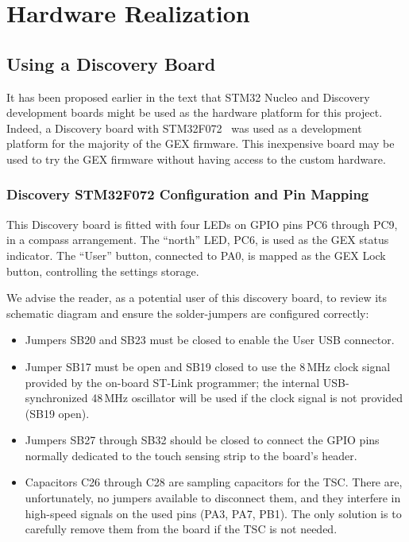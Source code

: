 \chapter{Hardware Realization} \label{sec:hwreal}

\section{Using a Discovery Board}

It has been proposed earlier in the text that STM32 Nucleo and Discovery development boards might be used as the hardware platform for this project. Indeed, a Discovery board with STM32F072~\cite{disco-f072} was used as a development platform for the majority of the GEX firmware. This inexpensive board may be used to try the GEX firmware without having access to the custom hardware.

\subsection{Discovery STM32F072 Configuration and Pin Mapping}

This Discovery board is fitted with four \glspl{LED} on \gls{GPIO} pins PC6 through PC9, in a compass arrangement. The ``north'' \gls{LED}, PC6, is used as the GEX status indicator. The ``User'' button, connected to PA0, is mapped as the GEX Lock button, controlling the settings storage.

We advise the reader, as a potential user of this discovery board, to review its schematic diagram and ensure the solder-jumpers are configured correctly:

\begin{itemize}
	\item Jumpers SB20 and SB23 must be closed to enable the User \gls{USB} connector.
	
	\item Jumper SB17 must be open and SB19 closed to use the 8\,MHz clock signal provided by the on-board ST-Link programmer; the internal USB-synchronized 48\,MHz oscillator will be used if the clock signal is not provided (SB19 open).
	
	\item Jumpers SB27 through SB32 should be closed to connect the \gls{GPIO} pins normally dedicated to the touch sensing strip to the board's header. 
	
	\item Capacitors C26 through C28 are sampling capacitors for the \gls{TSC}. There are, unfortunately, no jumpers available to disconnect them, and they interfere in high-speed signals on the used pins (PA3, PA7, PB1). The only solution is to carefully remove them from the board if the \gls{TSC} is not needed.
\end{itemize} 

